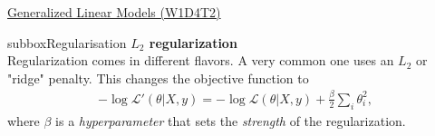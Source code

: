 \begin{textbox}{\href{https://compneuro.neuromatch.io/tutorials/W1D4_GeneralizedLinearModels/student/W1D4_Tutorial2.html}{Generalized Linear Models (W1D4T2)} }
\begin{subbox}{subbox}{Regularisation 
}
\textbf{$L_2$ regularization}\\
Regularization comes in different flavors. A very common one uses an $L_2$ or "ridge" penalty. This changes the objective function to
\begin{align}
-\log\mathcal{L}'(\theta | X, y)=
-\log\mathcal{L}(\theta | X, y) +\frac\beta2\sum_i\theta_i^2,
\end{align}
where $\beta$ is a \textit{hyperparameter} that sets the \textit{strength} of the regularization.

\end{subbox}
\end{textbox}
